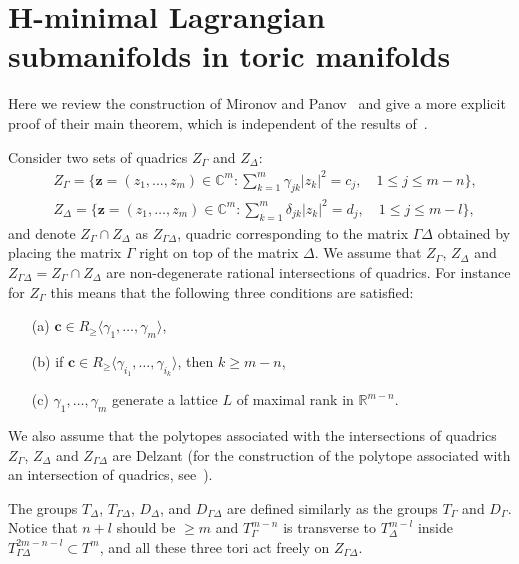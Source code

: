 \documentclass[jsg]{IP_v1_forauthors}
\def\ge{\geqslant}
\def\geq{\geqslant}
\def\leq{\leqslant}
\theoremstyle{definition}
\numberwithin{equation}{section}
\begin{document}
\section{H-minimal Lagrangian submanifolds in toric manifolds}

Here we review the construction of Mironov and Panov~\cite{MP2} and give a more
explicit proof of their main theorem, which is independent of the results
of~\cite{D}.

Consider two sets of quadrics $Z_\Gamma$ and $Z_\Delta$:
\begin{align}
&Z_\Gamma= \{\boldsymbol{z}=(z_1,\dots,z_m) \in {\mathbb C}^m \colon \sum_{k=1}^m \gamma_{jk}|z_k|^2= c_j,  \quad 1\leq j \leq m-n  \}, \\
&Z_\Delta=  \{\boldsymbol{z}=(z_1,\dots,z_m) \in {\mathbb C}^m \colon \sum_{k=1}^m \delta_{jk}|z_k|^2= d_j,  \quad 1\leq j \leq m-l \},
\end{align}
and denote $Z_\Gamma \cap Z_\Delta$ as $Z_{\Gamma \Delta}$, quadric corresponding to the matrix $\Gamma \Delta$ obtained by placing the matrix $\Gamma$ right on top of the matrix $\Delta$. We assume that  $Z_\Gamma$, $Z_\Delta$ and $Z_{\Gamma \Delta}=Z_\Gamma \cap Z_\Delta$ are non-degenerate rational intersections of quadrics. For instance for $Z_\Gamma$ this means that the following three conditions are satisfied:

\begin{itemize}

\item[(a)] $\boldsymbol{c} \in R_{\ge} \langle \gamma_1,\ldots,\gamma_m \rangle$,

\item[(b)] if $\boldsymbol{c} \in R_{\ge} \langle \gamma_{i_1},\ldots,\gamma_{i_k} \rangle$, then $k\geq m-n$,

\item[(c)] $\gamma_1,\ldots,\gamma_m$ generate a lattice $L$ of maximal rank in ${\mathbb R}^{m-n}$.
\end{itemize}

\noindent We also assume that the polytopes associated with the intersections of quadrics  $Z_\Gamma$, $Z_\Delta$ and $Z_{\Gamma \Delta}$ are Delzant (for the construction of the polytope associated with an intersection of quadrics, see~\cite{MP}).

The groups $T_\Delta$, $T_{\Gamma \Delta}$, $D_\Delta$, and $D_{\Gamma \Delta}$ are defined similarly as the groups $T_\Gamma$ and $D_\Gamma$. Notice that $n+l$ should be $\ge m$ and $T_\Gamma^{m-n}$ is transverse to $T_\Delta^{m-l}$ inside $T_{\Gamma \Delta}^{2m-n-l} \subset T^m$, and all these three tori act freely on $Z_{\Gamma \Delta}$.
\end{document}

